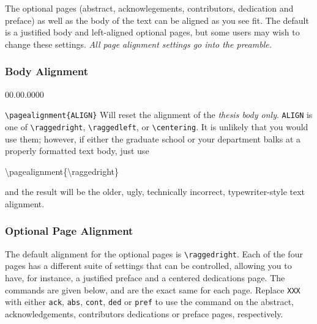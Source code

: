 The optional pages (abstract, acknowlegements, contributors, dedication
and preface) as well as the body of the text can be aligned as you
see fit. The default is a justified body and left-aligned optional
pages, but some users may wish to change these settings. \emph{All
page alignment settings go into the preamble.}


\subsubsection{Body Alignment}

\begin{lyxlist}{00.00.0000}
\item [\texttt{\textbackslash{}pagealignment\{ALIGN\}}]Will reset the alignment
of the \emph{thesis body only}. \texttt{ALIGN} is one of \texttt{\textbackslash{}raggedright},
\texttt{\textbackslash{}raggedleft}, or \texttt{\textbackslash{}centering}.
It is unlikely that you would use them; however, if either the graduate
school or your department balks at a properly formatted text body,
just use

\begin{lyxcode}
\textbackslash{}pagealignment\{\textbackslash{}raggedright\}
\end{lyxcode}
and the result will be the older, ugly, technically incorrect, typewriter-style
text alignment.

\end{lyxlist}

\subsubsection{Optional Page Alignment}

The default alignment for the optional pages is \texttt{\textbackslash{}raggedright}.
Each of the four pages has a different suite of settings that can
be controlled, allowing you to have, for instance, a justified preface
and a centered dedications page. The commands are given below, and
are the exact same for each page. Replace \texttt{XXX} with either
\texttt{ack}, \texttt{abs}, \texttt{cont}, \texttt{ded} or \texttt{pref}
to use the command on the abstract, acknowledgements, contributors
dedications or preface pages, respectively.

